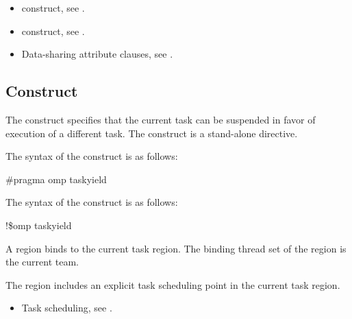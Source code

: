 \crossreferences
\begin{itemize}
\item {} construct, see .
\item {} construct, see .
\item Data-sharing attribute clauses, see . 
\end{itemize}




%
%
\subsection{ Construct}
\label{subsec:taskyield Construct}
\summary
The  construct specifies that the current task can be suspended in favor of 
execution of a different task. The  construct is a stand-alone directive.

\syntax
\ccppspecificstart
The syntax of the  construct is as follows:

\begin{boxedcode}
\#pragma omp taskyield 
\end{boxedcode}
\ccppspecificend

\fortranspecificstart
The syntax of the  construct is as follows:

\begin{boxedcode}
!\$omp taskyield
\end{boxedcode}
\fortranspecificend

\binding
A  region binds to the current task region. The binding thread set of the 
 region is the current team.

\descr
The  region includes an explicit task scheduling point in the current task 
region.

\crossreferences
\begin{itemize}
\item Task scheduling, see 
. 
\end{itemize}













